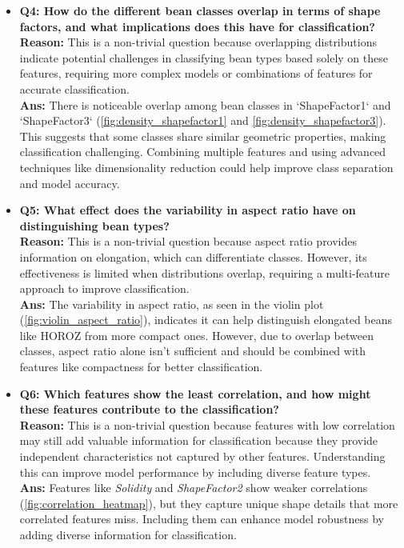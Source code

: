 \documentclass[a4paper,12pt]{article}
\begin{document}
\begin{itemize}
    \item \textbf{Q4: How do the different bean classes overlap in terms of shape factors, and what implications does this have for classification?}\\
    \textbf{Reason:} This is a non-trivial question because overlapping distributions indicate potential challenges in classifying bean types based solely on these features, requiring more complex models or combinations of features for accurate classification.\\
    \textbf{Ans:} There is noticeable overlap among bean classes in `ShapeFactor1` and `ShapeFactor3` (\autoref{fig:density_shapefactor1} and \autoref{fig:density_shapefactor3}). This suggests that some classes share similar geometric properties, making classification challenging. Combining multiple features and using advanced techniques like dimensionality reduction could help improve class separation and model accuracy.

    \item \textbf{Q5: What effect does the variability in aspect ratio have on distinguishing bean types?}\\
    \textbf{Reason:} This is a non-trivial question because aspect ratio provides information on elongation, which can differentiate classes. However, its effectiveness is limited when distributions overlap, requiring a multi-feature approach to improve classification.\\
    \textbf{Ans:} The variability in aspect ratio, as seen in the violin plot (\autoref{fig:violin_aspect_ratio}), indicates it can help distinguish elongated beans like HOROZ from more compact ones. However, due to overlap between classes, aspect ratio alone isn't sufficient and should be combined with features like compactness for better classification.

    \item \textbf{Q6: Which features show the least correlation, and how might these features contribute to the classification?}\\
    \textbf{Reason:} This is a non-trivial question because features with low correlation may still add valuable information for classification because they provide independent characteristics not captured by other features. Understanding this can improve model performance by including diverse feature types.\\
    \textbf{Ans:} Features like \textit{Solidity} and \textit{ShapeFactor2} show weaker correlations (\autoref{fig:correlation_heatmap}), but they capture unique shape details that more correlated features miss. Including them can enhance model robustness by adding diverse information for classification.


\end{itemize}
\end{document}
